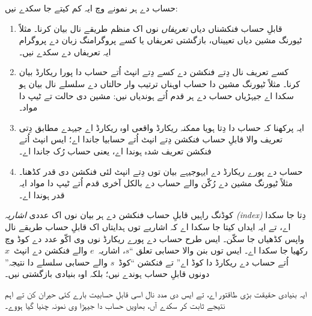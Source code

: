 \documentclass[../../../include/open-logic-section]{subfiles}
\begin{document}

حساب دے ہر نمونے وچ ایہ کم کیتے جا سکدے نیں:
\begin{enumerate}
\item قابلِ حساب فنکشناں دیاں \emph{تعریفاں} نوں اک منظم طریقے
  نال بیان کرنا۔ مثلاً ٹیورنگ مشین دیاں تعییناں، بازگشتی تعریفاں
  یا کسے پروگرامنگ زبان دے پروگرام ایہ تعریفاں دے سکدے نیں۔
\item کسے تعریف نال دِتے فنکشن دے کسے دِتے انپٹ اُتے حساب دا
  پورا ریکارڈ بیان کرنا۔ مثلاً ٹیورنگ مشین دا حساب اوہناں
  ترتیب وار حالتاں دے سلسلے نال بیان ہو سکدا اے جیہڑیاں حساب
  دے ہر قدم اُتے ہوندیاں نیں: مشین دی حالت تے ٹیپ دا مواد۔
\item ایہ پرکھنا کہ حساب دا دِتا ہویا ممکنہ ریکارڈ واقعی اوہ
  ریکارڈ اے جیہدے مطابق دِتی تعریف والا قابلِ حساب فنکشن دِتے
  انپٹ اُتے حسابیا جاندا اے؛ ایس انپٹ اُتے فنکشن تعریف شدہ
  ہوندا اے، یعنی حساب رُک جاندا اے۔
\item حساب دے پورے ریکارڈ دے ایہوجیہے بیان توں دِتے انپٹ لئی
  فنکشن دی قدر کڈھنا۔ مثلاً ٹیورنگ مشین دے رُکّن والے حساب
  دے بالکل آخری قدم اُتے ٹیپ دا مواد ایہ قدر ہوندا اے۔
\end{enumerate}

کوڈنگ راہیں قابلِ حساب فنکشن دے ہر بیان نوں اک عددی
\emph{اشاریہ (index)} دِتا جا سکدا اے، تے ایہ ایداں کیتا
جا سکدا اے کہ اشاریے توں ہدایتاں اک قابلِ حساب طریقے نال
واپس کڈھیاں جا سکّن۔ ایس طرح حساب دے پورے ریکارڈ نوں وی
اکّو عدد دے کوڈ وچ رکھیا جا سکدا اے۔ ایس توں بنن والا حسابی
تعلق ``$s$، اشاریہ~$e$ والے فنکشن دے انپٹ~$x$ اُتے حساب
دے ریکارڈ دا کوڈ اے'' تے فنکشن ``کوڈ~$s$ والے حسابی سلسلے
دا نتیجہ'' دونوں قابلِ حساب ہوندے نیں؛ بلکہ اوہ بنیادی
بازگشتی نیں۔

ایہ بنیادی حقیقت بڑی طاقتور اے، تے ایس دی مدد نال اسی
قابلِ حسابیت بارے کئی حیران کن تے اہم نتیجے ثابت کر سکدے
آں، بھاویں حساب دا جیہڑا وی نمونہ چنیا گیا ہووے۔
\end{document}
